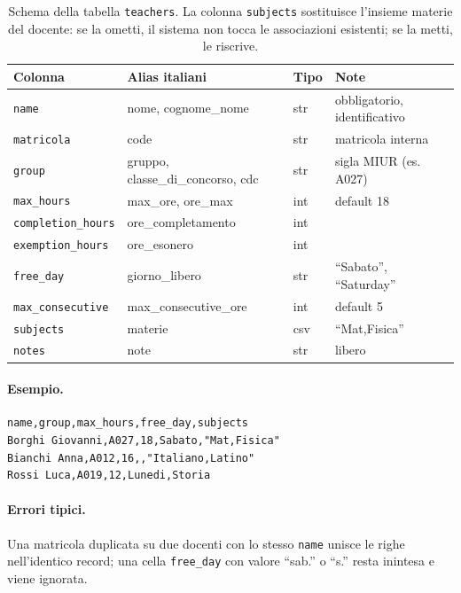 \begin{table}[h]
\centering\small
\begin{tabular}{l l l p{4.5cm}}
\toprule
\textbf{Colonna} & \textbf{Alias italiani} & \textbf{Tipo} & \textbf{Note} \\
\midrule
\texttt{name} & nome, cognome\_nome & str & obbligatorio, identificativo \\
\texttt{matricola} & code & str & matricola interna \\
\texttt{group} & gruppo, classe\_di\_concorso, cdc & str & sigla MIUR (es. A027) \\
\texttt{max\_hours} & max\_ore, ore\_max & int & default 18 \\
\texttt{completion\_hours} & ore\_completamento & int & \\
\texttt{exemption\_hours} & ore\_esonero & int & \\
\texttt{free\_day} & giorno\_libero & str & ``Sabato'', ``Saturday'' \\
\texttt{max\_consecutive} & max\_consecutive\_ore & int & default 5 \\
\texttt{subjects} & materie & csv & ``Mat,Fisica'' \\
\texttt{notes} & note & str & libero \\
\bottomrule
\end{tabular}
\caption{Schema della tabella \texttt{teachers}. La colonna
\texttt{subjects} sostituisce l'insieme materie del docente: se la
ometti, il sistema non tocca le associazioni esistenti; se la
metti, le riscrive.}
\label{tab:formato_teachers}
\end{table}

\paragraph{Esempio.}
\begin{lstlisting}
name,group,max_hours,free_day,subjects
Borghi Giovanni,A027,18,Sabato,"Mat,Fisica"
Bianchi Anna,A012,16,,"Italiano,Latino"
Rossi Luca,A019,12,Lunedi,Storia
\end{lstlisting}

\paragraph{Errori tipici.} Una matricola duplicata su due docenti
con lo stesso \texttt{name} unisce le righe nell'identico record;
una cella \texttt{free\_day} con valore ``sab.'' o ``s.'' resta
inintesa e viene ignorata.

